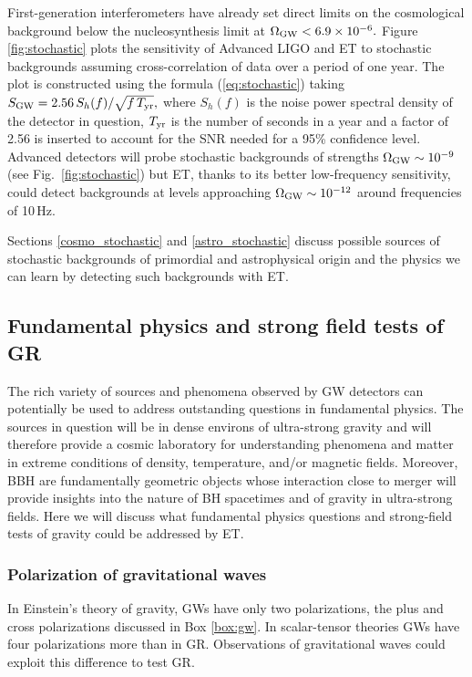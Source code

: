 First-generation interferometers have already set direct limits 
\cite{Abbott:2009ws} on the cosmological background below the 
nucleosynthesis limit at $\Omega_{\rm GW} < 6.9\times 10^{-6}.$ 
Figure \ref{fig:stochastic} plots the sensitivity of Advanced LIGO
and ET to stochastic backgrounds assuming cross-correlation of data
over a period of one year. The plot is constructed using the formula 
(\ref{eq:stochastic}) taking $S_{\rm GW}=2.56\,S_h(f)/\sqrt{f\,T_{\rm yr}},$
where $S_h(f)$ is the noise power spectral density of the detector
in question, $T_{\rm yr}$ is the number of seconds in a year and a
factor of 2.56 is inserted to account for the SNR needed for a 95\%
confidence level.  Advanced detectors will probe stochastic backgrounds of strengths
$\Omega_{\rm GW} \sim 10^{-9}$ (see Fig.~\ref{fig:stochastic}) but
ET, thanks to its better low-frequency sensitivity, could detect
backgrounds at levels approaching $\Omega_{\rm GW} \sim 10^{-12}$ 
around frequencies of 10\,Hz. 

Sections \ref{cosmo_stochastic} and \ref{astro_stochastic}
discuss possible sources of stochastic backgrounds of primordial
and astrophysical origin and the physics we can
learn by detecting such backgrounds with ET.

\clearpage

\FloatBarrier
\subsection{Fundamental physics and strong field tests of GR}

The rich variety of sources and phenomena observed by
GW detectors can potentially be used
to address outstanding questions in fundamental physics.
The sources in question will be in dense environs
of ultra-strong gravity and will therefore provide a cosmic
laboratory for understanding phenomena and matter in
extreme conditions of density, temperature, and/or magnetic
fields. Moreover, BBH are
fundamentally geometric objects whose interaction close
to merger will provide insights into the nature of 
BH spacetimes and of gravity in ultra-strong fields.
Here we will discuss what fundamental physics
questions and strong-field tests of gravity could be
addressed by ET.

\FloatBarrier
\subsubsection{Polarization of gravitational waves}
In Einstein's theory of gravity, GWs have only two polarizations, 
the plus and cross polarizations discussed in Box \ref{box:gw}. 
In scalar-tensor theories GWs have four polarizations more 
than in GR. Observations of gravitational waves 
could exploit this difference to test GR.

